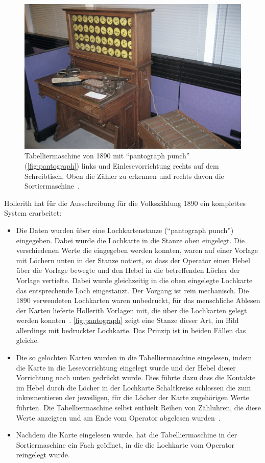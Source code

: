 \documentclass[parskip=half]{scrartcl}
\begin{document}
\begin{figure}[h]
  \centering
  \includegraphics[width=\textwidth]{manuell}
  \caption{Tabelliermaschine von 1890 mit \enquote{pantograph punch}
    (\autoref{fig:pantograph}) links und Einlesevorrichtung rechts auf dem
    Schreibtisch. Oben die Zähler zu erkennen und rechts davon die
    Sortiermaschine~\cite{1890}.}
  \label{fig:1890}
\end{figure}

Hollerith hat für die Ausschreibung für die Volkszählung 1890 ein komplettes
System erarbeitet:

\begin{itemize}
  \item Die Daten wurden über eine Lochkartenstanze (\enquote{pantograph punch})
    eingegeben. Dabei wurde
    die Lochkarte in die Stanze oben eingelegt. Die verschiedenen Werte die
    eingegeben werden konnten, waren auf einer Vorlage mit Löchern unten in
    der Stanze notiert, so dass der Operator einen Hebel über die Vorlage
    bewegte und den Hebel in die betreffenden Löcher der Vorlage vertiefte.
    Dabei wurde gleichzeitig in die oben eingelegte Lochkarte das entsprechende
    Loch eingestanzt. Der Vorgang ist rein mechanisch. Die 1890 verwendeten
    Lochkarten waren unbedruckt, für das menschliche Ablesen der Karten
    lieferte Hollerith Vorlagen mit, die über die Lochkarten gelegt werden
    konnten~\cite{austrian1982herman}. \autoref{fig:pantograph} zeigt eine
    Stanze dieser Art, im Bild allerdings mit bedruckter Lochkarte. Das
    Prinzip ist in beiden Fällen das gleiche.
  \item Die so gelochten Karten wurden in die Tabelliermaschine eingelesen,
    indem die Karte in die Lesevorrichtung eingelegt wurde und der Hebel dieser
    Vorrichtung nach unten gedrückt wurde. Dies führte dazu dass die Kontakte
    im Hebel durch die Löcher in der Lochkarte Schaltkreise schlossen die zum
    inkrementieren der jeweiligen, für die Löcher der Karte zugehörigen Werte
    führten. Die Tabelliermaschine selbst enthielt Reihen von Zähluhren, die
    diese Werte anzeigten und am Ende vom Operator abgelesen
    wurden~\cite{deutschesMuseum}.
  \item Nachdem die Karte eingelesen wurde, hat die Tabelliermaschine in der
    Sortiermaschine ein Fach geöffnet, in die die Lochkarte vom Operator
    reingelegt wurde.
\end{itemize}
\end{document}
